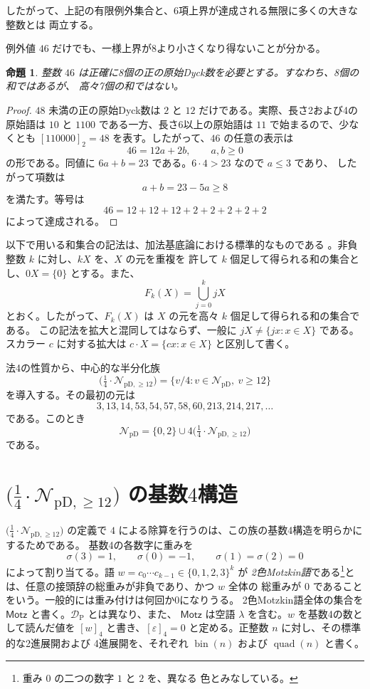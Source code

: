 \documentclass[12pt]{ltjsarticle}
\theoremstyle{plain}
\newtheorem{proposition}[theorem]{命題}
\theoremstyle{definition}
\theoremstyle{plain}
\newcommand{\NpD}{\mathcal{N}_{\mathrm{pD}}}
\newcommand{\DP}{\mathcal{D}_{\mathrm{P}}}
\newcommand{\Pset}{%
  \bigl(\tfrac{1}{4}\cdot\mathcal{N}_{\mathrm{pD},\geq 12}\bigr)%
}
\begin{document}
したがって、上記の有限例外集合と、6項上界が達成される無限に多くの大きな整数とは
両立する。

例外値 $46$ だけでも、一様上界が8より小さくなり得ないことが分かる。

\begin{proposition}\label{prop:46}
整数 $46$ は正確に8個の正の原始Dyck数を必要とする。すなわち、8個の和ではあるが、
高々7個の和ではない。
\end{proposition}

\begin{proof}
$48$ 未満の正の原始Dyck数は $2$ と $12$ だけである。実際、長さ2および4の原始語は
$10$ と $1100$ である一方、長さ6以上の原始語は $11$ で始まるので、少なくとも
$[110000]_2=48$ を表す。したがって、$46$ の任意の表示は
\[
        46=12a+2b,\qquad a,b\geq0
\]
の形である。同値に $6a+b=23$ である。$6\cdot4>23$ なので $a\leq3$ であり、
したがって項数は
\[
        a+b=23-5a\geq8
\]
を満たす。等号は
\[
        46=12+12+12+2+2+2+2+2
\]
によって達成される。
\end{proof}

以下で用いる和集合の記法は、加法基底論における標準的なものである
\cite[Chap.\ 1]{Nathanson}。非負整数 $k$ に対し、$kX$ を、$X$ の元を重複を
許して $k$ 個足して得られる和の集合とし、$0X=\{0\}$ とする。また、
\[
 F_k(X)=\bigcup_{j=0}^{k}jX
\]
とおく。したがって、$F_k(X)$ は $X$ の元を高々 $k$ 個足して得られる和の集合である。
この記法を拡大と混同してはならず、一般に $jX\neq\{jx:x\in X\}$ である。
スカラー $c$ に対する拡大は $c\cdot X=\{cx:x\in X\}$ と区別して書く。

法4の性質から、中心的な半分化族
\begin{equation}\label{eq:P-def}
 \Pset=\{v/4:v\in\NpD,\ v\geq12\}
\end{equation}
を導入する。その最初の元は
\[
 3,13,14,53,54,57,58,60,213,214,217,\ldots
\]
である。このとき
\begin{equation}\label{eq:NpD-decomp}
 \NpD=\{0,2\}\cup4\Pset
\end{equation}
である。

\section{\texorpdfstring{$\Pset$}{P} の基数\texorpdfstring{$4$}{4}構造}
\label{sec:base4}

$\Pset$ の定義で $4$ による除算を行うのは、この族の基数4構造を明らかにするためである。
基数4の各数字に重みを
\[
  \sigma(3)=1,\qquad \sigma(0)=-1,\qquad
  \sigma(1)=\sigma(2)=0
\]
によって割り当てる。語 $w=c_0\cdots c_{k-1}\in\{0,1,2,3\}^{k}$ が
\emph{2色Motzkin語}である\footnote{重み $0$ の二つの数字 $1$ と $2$ を、異なる
色とみなしている。}とは、任意の接頭辞の総重みが非負であり、かつ $w$ 全体の
総重みが $0$ であることをいう。一般的には重み付けは何回か$0$になりうる。
2色Motzkin語全体の集合を $\mathsf{Motz}$ と書く。$\DP$ とは異なり、また、
$\mathsf{Motz}$ は空語 $\lambda$ を含む。$w$ を基数4の数として読んだ値を $[w]_4$
と書き、$[\varepsilon]_4=0$ と定める。正整数 $n$ に対し、その標準的な2進展開および
4進展開を、それぞれ $\operatorname{bin}(n)$ および $\operatorname{quad}(n)$ と書く。
\end{document}
